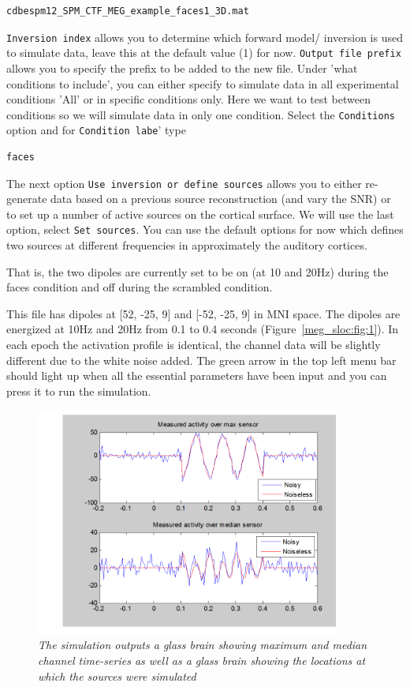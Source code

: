 \begin{verbatim}
cdbespm12_SPM_CTF_MEG_example_faces1_3D.mat
\end{verbatim}

\texttt{Inversion index} allows you to determine which forward model/ inversion is used to simulate data, leave this at the default value (1) for now.
\texttt{Output file prefix} allows you to specify the prefix to be added to the new file.
Under 'what conditions to include',  you can either specify to simulate data in all experimental conditions 'All' or in specific conditions only. Here we want to test between conditions so we will simulate data  in only one condition. Select the \texttt{Conditions} option and for \texttt{Condition labe}'  type 
\begin{verbatim}
faces
\end{verbatim}

The next option \texttt{Use inversion or define sources} allows you to either re-generate data based on a previous source reconstruction (and vary the SNR) or to set up a number of active sources on the cortical surface. We will use the last option, select \texttt{Set sources}. You can use the default options for now which defines two sources at different frequencies in approximately the auditory cortices.

That is, the two dipoles are currently set to be on (at 10 and 20Hz) during the faces condition and off during the scrambled condition.

This file has dipoles at [52, -25, 9] and  [-52, -25, 9] in MNI space. The dipoles are energized at 10Hz and 20Hz from 0.1 to 0.4 seconds (Figure~\ref{meg_sloc:fig:1}). In each epoch the activation profile is identical, the channel data will be slightly different due to the white noise added. The green arrow in the top left menu bar should light up when all the essential parameters have been input and you can press it to run the simulation.

\begin{figure}
\begin{center}
\includegraphics[width=100mm]{meg_sloc/slide2}
\caption{\em The simulation outputs a glass brain showing maximum and median channel time-series as well as a glass brain showing the locations at which the sources were simulated } \label{meg_sloc:fig:2}
\end{center}
\end{figure}


